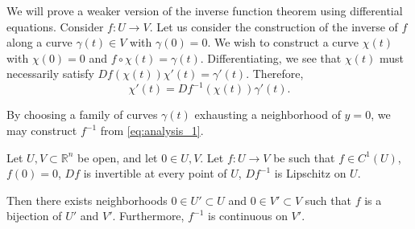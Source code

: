 We will prove a weaker version of the inverse function theorem using differential equations. Consider $f: U \to V$. Let us consider the construction of the inverse of $f$ along a curve $\gamma(t) \in V$ with $\gamma(0) = 0$. We wish to construct a curve $\chi(t)$ with $\chi(0) = 0$ and $f\circ \chi (t) = \gamma(t)$. Differentiating, we see that $\chi(t)$ must necessarily satisfy $Df(\chi(t))\chi'(t) = \gamma'(t)$. Therefore, 
\begin{equation}\label{eq:analysis_1}
\chi'(t) = Df^{-1}(\chi(t)) \gamma'(t).
\end{equation}

By choosing a family of curves $\gamma(t)$ exhausting a neighborhood of $y=0$, we may construct $f^{-1}$ from \eqref{eq:analysis_1}.

\begin{proposition}
Let $U, V \subset \mathbb R^n$ be open, and let $0\in U, V$. Let $f: U \to V$ be such that $f\in C^1(U)$, $f(0) = 0$, $Df$ is invertible at every point of $U$, $Df^{-1}$ is Lipschitz on $U$.

Then there exists neighborhoods $0\in U' \subset U$ and $0\in V' \subset V$ such that $f$ is a bijection of $U'$ and $V'$. Furthermore, $f^{-1}$ is continuous on $V'$.
\end{proposition}

